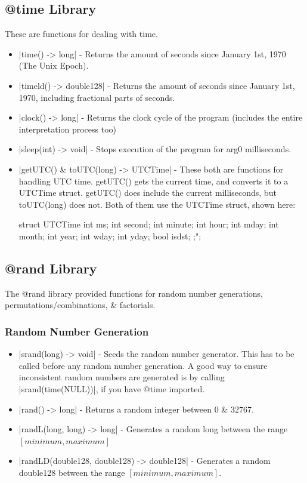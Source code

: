 \documentclass[12pt, letterpaper, oneside]{article}
\begin{document}
	\subsection{@time Library}
	These are functions for dealing with time.
	\begin{itemize}
		\item[--] \spverb|time() -> long| - Returns the amount of seconds since January 1st, 1970 (The Unix Epoch).
		\label{misc:timeld}
		\item[--] \spverb|timeld() -> double128| - Returns the amount of seconds since January 1st, 1970, including fractional parts of seconds.
		\item[--] \spverb|clock() -> long| - Returns the clock cycle of the program (includes the entire interpretation process too)
		\item[--] \spverb|sleep(int) -> void| - Stops execution of the program for arg0 milliseconds.
		\item[--] \spverb|getUTC() & toUTC(long) -> UTCTime| - These both are functions for handling UTC time. getUTC() gets the current time, and converts it to a UTCTime struct. getUTC() does include the current milliseconds, but toUTC(long) does not. Both of them use the UTCTime struct, shown here:
		
		
		\begin{spverbatim}
			struct UTCTime {
				int ms;
				int second;
				int minute;
				int hour;
				int mday;
				int month;
				int year;
				int wday;
				int yday;
				bool isdst;
			};";
		\end{spverbatim}
	\end{itemize}
	\subsection{@rand Library}
	The @rand library provided functions for random number generations, permutations/combinations, \& factorials.
	\subsubsection{Random Number Generation}
		\begin{itemize}
			\item[--] \spverb|srand(long) -> void| - Seeds the random number generator. This has to be called before any random number generation. A good way to ensure inconsistent random numbers are generated is by calling \spverb|srand(time(NULL))|, if you have @time imported.
			\item[--] \spverb|rand() -> long| - Returns a random integer between 0 \& 32767.
			\item[--] \spverb|randL(long, long) -> long| - Generates a random long between the range $[minimum, maximum]$
			\item[--] \spverb|randLD(double128, double128) -> double128| - Generates a random double128 between the range $[minimum, maximum]$.
		\end{itemize}
\end{document}
